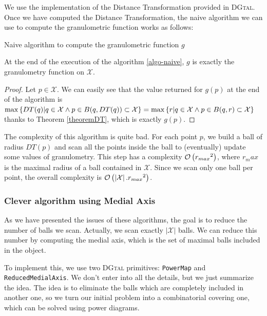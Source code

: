 We use the implementation of the Distance Transformation provided in \textsc{DGtal}. Once we have computed the Distance Transformation, the naive algorithm we can use to compute the granulometric function works as follows:

\IncMargin{1em}
\begin{algorithm}
\caption{Naive algorithm to compute the granulometric function $g$}
\label{algo-naive}
\end{algorithm}

\begin{theoreme}
	At the end of the execution of the algorithm \ref{algo-naive}, $g$ is exactly the granulometry function on $\mathcal{X}$.
\end{theoreme}

\begin{proof}
Let $p \in \mathcal{X}$. We can easily see that the value returned for $g(p)$ at the end of the algorithm is 
$ \operatorname{max} \left\{ DT(q) | q \in \mathcal{X} \wedge p \in B(q,DT(q)) \subset \mathcal{X} \right\} 
= \operatorname{max} \left\{ r | q \in \mathcal{X} \wedge p \in B(q,r) \subset \mathcal{X} \right\}$ thanks to Theorem \ref{theoremDT}, which is exactly $g(p)$.
\end{proof}

The complexity of this algorithm is quite bad. For each point $p$, we build a ball of radius $DT(p)$ and scan all the points inside the ball to (eventually) update some values of granulometry. This step has a complexity $\mathcal O \left( {r_{max}}^2 \right)$, where $r_max$ is the maximal radius of a ball contained in $\mathcal{X}$. Since we scan only one ball per point, the overall complexity is $\mathcal O \left( \left| \mathcal{X} \right|. {r_{max}}^2 \right)$.

\subsubsection{Clever algorithm using Medial Axis}

As we have presented the issues of these algorithms, the goal is to reduce the number of balls we scan. Actually, we scan exactly $\left| \mathcal{X} \right|$ balls. We can reduce this number by computing the medial axis, which is the set of maximal balls included in the object.

To implement this, we use two \textsc{DGtal} primitives: \texttt{PowerMap} and \texttt{ReducedMedialAxis}. We don't enter into all the details, but we just summarize the idea. The idea is to eliminate the balls which are completely included in another one, so we turn our initial problem into a combinatorial covering one, which can be solved using power diagrams. 

